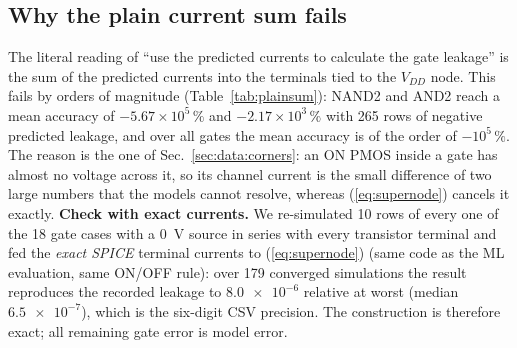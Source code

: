 \subsection{Why the plain current sum fails}\label{sec:gates:plain}
The literal reading of ``use the predicted currents to calculate the gate leakage'' is the sum of the predicted currents into the terminals tied to the $V_{DD}$ node. This fails by orders of magnitude (Table~\ref{tab:plainsum}): NAND2 and AND2 reach a mean accuracy of $-5.67\times10^{5}\,\%$ and $-2.17\times10^{3}\,\%$ with 265 rows of negative predicted leakage, and over all gates the mean accuracy is of the order of $-10^{5}\,\%$. The reason is the one of Sec.~\ref{sec:data:corners}: an ON PMOS inside a gate has almost no voltage across it, so its channel current is the small difference of two large numbers that the models cannot resolve, whereas (\ref{eq:supernode}) cancels it exactly.
\textbf{Check with exact currents.} We re-simulated 10 rows of every one of the 18 gate cases with a \SI{0}{\volt} source in series with every transistor terminal and fed the \emph{exact SPICE} terminal currents to (\ref{eq:supernode}) (same code as the ML evaluation, same ON/OFF rule): over 179 converged simulations the result reproduces the recorded leakage to $\num{8.0e-6}$ relative at worst (median $\num{6.5e-7}$), which is the six-digit CSV precision. The construction is therefore exact; all remaining gate error is model error.
\begin{table}[t]
\caption{Plain sum of the currents into the $V_{DD}$ terminals versus the super-node method (final models, 3,600 rows).}
\label{tab:plainsum}
\centering\footnotesize
\setlength{\tabcolsep}{2.5pt}
\fitcol{}
\end{table}
